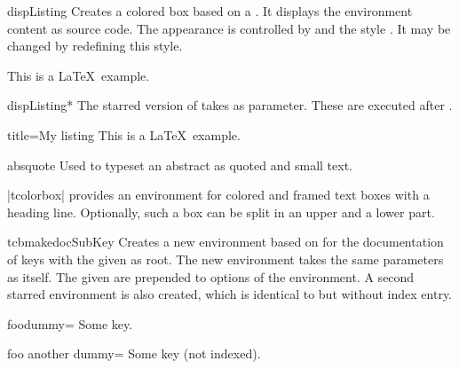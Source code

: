 \clearpage
\begin{docEnvironment}{dispListing}{}
  Creates a colored box based on a .
  It displays the environment content as source code.
  The appearance is controlled by 
  and the style . It may be
  changed by redefining this style.
\begin{dispExample}
\begin{dispListing}
This is a \LaTeX\ example.
\end{dispListing}
\end{dispExample}
\end{docEnvironment}

\begin{docEnvironment}{dispListing*}{}
  The starred version of  takes  
  as parameter. These  are executed after .
\begin{dispExample}
\begin{dispListing*}{title=My listing}
This is a \LaTeX\ example.
\end{dispListing*}
\end{dispExample}
\end{docEnvironment}


\begin{docEnvironment}{absquote}{}
  Used to typeset an abstract as quoted and small text.
\begin{dispExample}
\begin{absquote}
|tcolorbox| provides an environment for colored and framed text boxes with a
heading line. Optionally, such a box can be split in an upper and a lower part.
\end{absquote}
\end{dispExample}
\end{docEnvironment}

\clearpage
\begin{docCommand}[doc updated=2023-12-01]{tcbmakedocSubKey}{}
  Creates a new environment  based on  for the
  documentation of keys with the given  as root.
  The new environment  takes the same para\-meters as  itself.
  The given  are prepended to options of the  environment.
  A second starred environment  is also created, which is identical
  to  but without index entry.
\begin{dispExample}

\begin{docFooKey}{foodummy}{=}{\tcbdocdescDefaultInitEmpty}
Some key.
\end{docFooKey}

\begin{docFooKey*}{foo another dummy}{=}{\tcbdocdescDefaultInitEmpty}
Some key (not indexed).
\end{docFooKey*}
\end{dispExample}
\end{docCommand}


